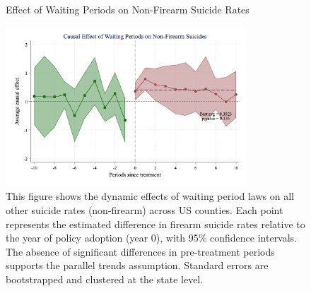 \pagebreak
\clearpage

\begin{figure}[htbp]
    \centering
    \caption{Effect of Waiting Periods on Non-Firearm Suicide Rates}
    \label{fig:firearm_suicide_DID_other}
    \includegraphics[width=0.8\textwidth]{figures/1039-csid-all-other-noNY.png}
    \begin{minipage}{\linewidth}
    \caption*{\footnotesize{
    This figure shows the dynamic effects of waiting period laws on all other suicide rates (non-firearm) across US counties. Each point represents the estimated difference in firearm suicide rates relative to the year of policy adoption (year 0), with 95\% confidence intervals. The absence of significant differences in pre-treatment periods supports the parallel trends assumption. Standard errors are bootstrapped and clustered at the state level. }}
  \end{minipage}
\end{figure}

\pagebreak
\clearpage

